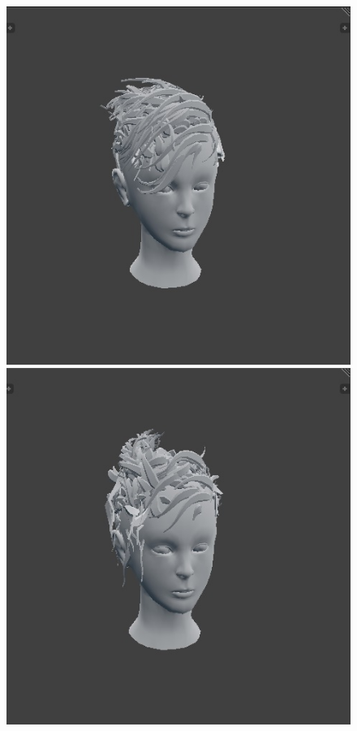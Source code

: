 \documentclass[ %
author={Dillon Keith Diep},
supervisor={Dr. Carl Henrik Ek},
degree={MEng},
title={ART-CG Hair:},
subtitle={Assisted Real-time Content Generation of Stylised Virtual Hair},
type={Research},
year={2017} ]{dissertation}
\begin{document}
\begin{figure}[!h]
	\includegraphics[scale=0.25]{images/outputMesh5}
	\includegraphics[scale=0.25]{images/outputMesh6}

\end{figure}
\end{document}

